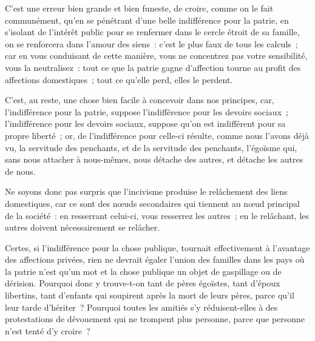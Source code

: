 \documentclass[french,twoside]{book} %
\begin{document}
C’est une erreur bien grande et bien funeste, de croire, comme on le fait communément, qu’en se pénétrant d’une belle indifférence pour la patrie, en s’isolant de l’intérêt public pour se renfermer dans le cercle étroit de sa famille, on se renforcera dans l’amour des siens : c’est le plus faux de tous les calculs ; car en vous conduisant de cette manière, vous ne concentrez pas votre sensibilité, vous la neutralisez : tout ce que la patrie gagne d’affection tourne au profit des affections domestiques ; tout ce qu’elle perd, elles le perdent.\par
C’est, au reste, une chose bien facile à concevoir dans nos principes, car, l’indifférence pour la patrie, suppose l’indifférence pour les devoirs sociaux ; l’indifférence pour les devoirs sociaux, suppose qu’on est indifférent pour sa propre liberté ; or, de l’indifférence pour celle-ci résulte, comme nous l’avons déjà vu, la servitude des penchants, et de la servitude des penchants, l’égoïsme qui, sans nous attacher à nous-mêmes, nous détache des autres, et détache les autres de nous.\par
Ne soyons donc pas surpris que l’incivisme produise le relâchement des liens domestiques, car ce sont des nœuds secondaires qui tiennent au nœud principal de la société : en resserrant celui-ci, vous resserrez les autres ; en le relâchant, les autres doivent nécessairement se relâcher.\par
Certes, si l’indifférence pour la chose publique, tournait effectivement à l’avantage des affections privées, rien ne devrait égaler l’union des familles dans les pays où la patrie n’est qu’un mot et la chose publique un objet de gaspillage ou de dérision. Pourquoi donc y trouve-t-on tant de pères égoïstes, tant d’époux libertins, tant d’enfants qui soupirent après la mort de leurs pères, parce qu’il leur tarde d’hériter ? Pourquoi toutes les amitiés s’y réduisent-elles à des protestations de dévouement qui ne trompent plus personne, parce que personne n’est tenté d’y croire ?\par
\end{document}
